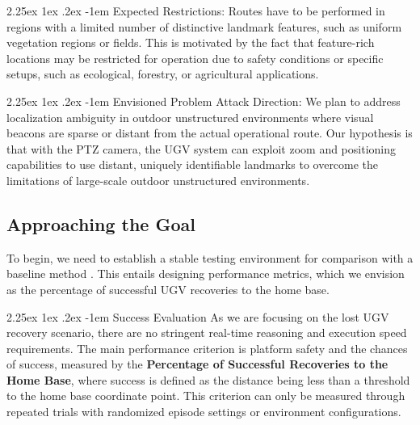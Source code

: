 \documentclass[runningheads]{llncs}
\makeatletter
\renewcommand\paragraph{\@startsection{paragraph}{4}{\z@}%
                                    {2.25ex \@plus1ex \@minus.2ex}%
                                    {-1em}%
                                    {\normalfont\normalsize\bfseries}}
\makeatother
\begin{document}
\paragraph{Expected Restrictions}:
Routes have to be performed in regions with a limited number of distinctive landmark features, such as uniform vegetation regions or fields. This is motivated by the fact that feature-rich locations may be restricted for operation due to safety conditions or specific setups, such as ecological, forestry, or agricultural applications.

\paragraph{Envisioned Problem Attack Direction}:
We plan to address localization ambiguity in outdoor unstructured environments where visual beacons are sparse or distant from the actual operational route. Our hypothesis is that with the PTZ camera, the UGV system can exploit zoom and positioning capabilities to use distant, uniquely identifiable landmarks to overcome the limitations of large-scale outdoor unstructured environments.


\subsection{Approaching the Goal}

To begin, we need to establish a stable testing environment for comparison with a baseline method \cite{VisualTeachAndRepeat}. This entails designing performance metrics, which we envision as the percentage of successful UGV recoveries to the home base.

\paragraph{Success Evaluation}
As we are focusing on the lost UGV recovery scenario, there are no stringent real-time reasoning and execution speed requirements. The main performance criterion is platform safety and the chances of success, measured by the \textbf{Percentage of Successful Recoveries to the Home Base}, where success is defined as the distance being less than a threshold to the home base coordinate point. This criterion can only be measured through repeated trials with randomized episode settings or environment configurations.
\end{document}
